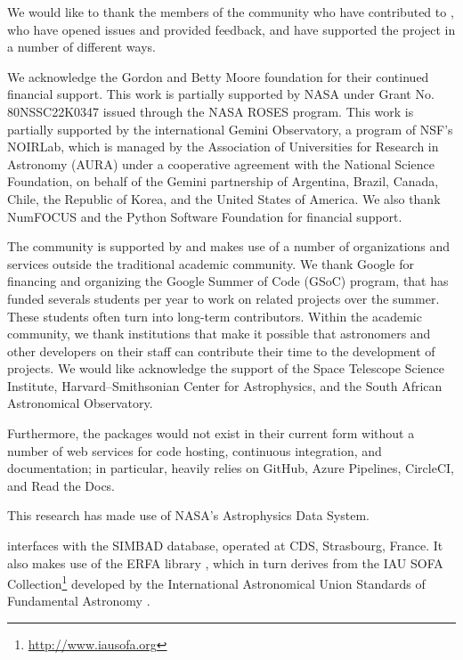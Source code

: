 \documentclass[modern]{aastex631}
\begin{document}
\begin{acknowledgments}

We would like to thank the members of the community who have contributed to
\astropy, who have opened issues and provided feedback, and have supported the
project in a number of different ways.

We acknowledge the Gordon and Betty Moore foundation for their continued
financial support.
This work is partially supported by NASA under Grant No. 80NSSC22K0347 issued
through the NASA ROSES program.
This work is partially supported by the international Gemini Observatory, a
program of NSF's NOIRLab, which is managed by the Association of Universities
for Research in Astronomy (AURA) under a cooperative agreement with the National
Science Foundation, on behalf of the Gemini partnership of Argentina, Brazil,
Canada, Chile, the Republic of Korea, and the United States of America.
We also thank NumFOCUS and the Python Software Foundation for financial
support.

The \astropy community is supported by and makes use of a number of
organizations and services outside the traditional academic community.
We thank Google for financing and organizing the
Google Summer of Code (GSoC) program, that has funded severals
students per year to work on \astropy related projects over the
summer. These students often turn into long-term contributors.
Within the academic community, we thank institutions that make it possible that
astronomers and other developers on their staff can contribute their time to the
development of \astropy projects.
We would like acknowledge the support of the Space Telescope Science Institute,
Harvard--Smithsonian Center for Astrophysics, and the South African Astronomical
Observatory.

Furthermore, the \astropy packages would not exist in their current form without
a number of web services for code hosting, continuous integration, and
documentation; in particular, \astropy heavily relies on GitHub, Azure
Pipelines, CircleCI, and Read the Docs.

This research has made use of NASA's Astrophysics Data System.

\astropypkg interfaces with the SIMBAD database, operated at CDS, Strasbourg,
France. It also makes use of the ERFA library \citep{erfa}, which in turn
derives from the IAU SOFA Collection\footnote{\url{http://www.iausofa.org}}
developed by the International Astronomical Union Standards of Fundamental
Astronomy \citep{sofa}.

\end{acknowledgments}
\end{document}
